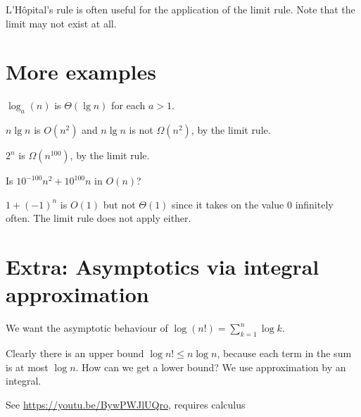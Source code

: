 L'H\^{o}pital's rule is often useful for the application of the limit rule. Note that the 
limit may not exist at all.


\section{More examples}

\begin{Boxample}[4]
$\log_a(n)$ is $\Theta(\lg n)$ for each $a > 1$.
\end{Boxample}

\begin{Boxample}
$n \lg n$ is $O(n^2)$ and $n \lg n$ is not $\Omega(n^2)$, by the limit rule.
\end{Boxample}

\begin{Boxample}
$2^n$ is $\Omega(n^{100})$, by the limit rule.
\end{Boxample}

\begin{Boxample}[4]
Is $10^{-100} n^2 + 10^{100} n$ in $O(n)$?
\end{Boxample}

\begin{Boxample}
$1 + (-1)^n$ is $O(1)$ but not $\Theta(1)$ since it takes on the value $0$
 infinitely often. The limit rule does not apply either.
\end{Boxample}
 
\section{Extra: Asymptotics via integral approximation}
\begin{Boxample}
We want the asymptotic behaviour of $\log (n!) = \sum_{k=1}^n \log k$.

Clearly there is an upper bound $\log n! \leq n \log n$, because each term in the sum is at most $\log n$. 
How can we get a lower bound? We use approximation by an integral.


\par\vspace*{8cm}\hfill\footnotesize See \url{https://youtu.be/BywPWJlUQro}, requires calculus
\end{Boxample}

